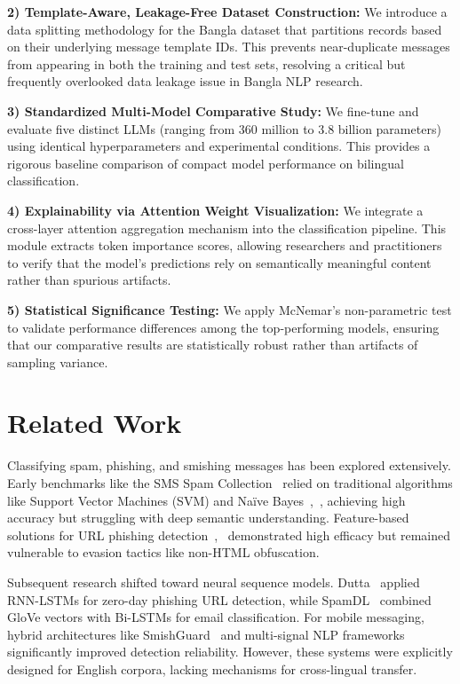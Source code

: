 \documentclass[journal]{IEEEtran}
\begin{document}
\textbf{2) Template-Aware, Leakage-Free Dataset Construction:} We introduce a data splitting methodology for the Bangla dataset that partitions records based on their underlying message template IDs. This prevents near-duplicate messages from appearing in both the training and test sets, resolving a critical but frequently overlooked data leakage issue in Bangla NLP research.

\textbf{3) Standardized Multi-Model Comparative Study:} We fine-tune and evaluate five distinct LLMs (ranging from 360 million to 3.8 billion parameters) using identical hyperparameters and experimental conditions. This provides a rigorous baseline comparison of compact model performance on bilingual classification.

\textbf{4) Explainability via Attention Weight Visualization:} We integrate a cross-layer attention aggregation mechanism into the classification pipeline. This module extracts token importance scores, allowing researchers and practitioners to verify that the model's predictions rely on semantically meaningful content rather than spurious artifacts.

\textbf{5) Statistical Significance Testing:} We apply McNemar's non-parametric test to validate performance differences among the top-performing models, ensuring that our comparative results are statistically robust rather than artifacts of sampling variance.



\section{Related Work}

Classifying spam, phishing, and smishing messages has been explored extensively. Early benchmarks like the SMS Spam Collection~\cite{ref1} relied on traditional algorithms like Support Vector Machines (SVM) and Naïve Bayes~\cite{ref1},~\cite{ref5}, achieving high accuracy but struggling with deep semantic understanding. Feature-based solutions for URL phishing detection~\cite{ref2},~\cite{ref8} demonstrated high efficacy but remained vulnerable to evasion tactics like non-HTML obfuscation.

Subsequent research shifted toward neural sequence models. Dutta~\cite{ref3} applied RNN-LSTMs for zero-day phishing URL detection, while SpamDL~\cite{ref9} combined GloVe vectors with Bi-LSTMs for email classification. For mobile messaging, hybrid architectures like SmishGuard~\cite{ref6} and multi-signal NLP frameworks~\cite{ref10} significantly improved detection reliability. However, these systems were explicitly designed for English corpora, lacking mechanisms for cross-lingual transfer.
\end{document}
